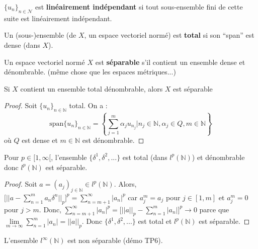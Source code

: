 \begin{definition}
    $\{u_n\}_{n\in\mathcal{N}}$ est \textbf{linéairement indépendant} si tout sous-ensemble fini de cette suite est linéairement indépendant.
\end{definition}

\begin{definition}
    Un (sous-)ensemble (de $X$, un espace vectoriel normé) est \textbf{total} si son ``span'' est dense (dans $X$).
\end{definition}

\begin{definition}
    Un espace vectoriel normé $X$ est \textbf{séparable} s'il contient un ensemble dense et dénombrable. (même chose que les espaces métriques...)
\end{definition}

\begin{theo}
    Si $X$ contient un ensemble total dénombrable, alors $X$ est séparable
\end{theo}

\begin{proof}
    Soit $\{u_n\}_{n\in\mathbb{N}}$ total. On a :
    \begin{equation*}
        \mathrm{span}\{u_n\}_{n\in\mathbb{N}} = \left\{ \sum_{j=1}^m \alpha_j u_{n_j} \Big | n_j\in\mathbb{N}, \alpha_j\in Q,m\in\mathbb{N} \right\}
    \end{equation*}
    où $Q$ est dense et $m\in \mathbb{N}$ est dénombrable.
\end{proof}

\begin{example}
    Pour $p \in [1,\infty[$, l'ensemble $\{\delta^1,\delta^2,...\}$ est total (dans $l^p(\mathbb{N})$) et dénombrable donc $l^p(\mathbb{N})$ est séparable.
\end{example}

\begin{proof}
    Soit $a = (a_j)_{j\in\mathbb{N}} \in l^p(\mathbb{N})$. Alors, $\big[||a-\sum \limits_{n=1}^m a_n \delta^n||_p\big]^p = \sum \limits_{n=m+1}^\infty |a_n|^p$ car $a_j^m = a_j$ pour $j \in [1,m]$ et $a_j^m = 0$ pour $j>m$. Donc, $\sum \limits_{n=m+1}^\infty |a_n|^p = \big[||a||_p - \sum \limits_{n=1}^m |a_n|\big]^p \rightarrow 0$ parce que $\lim \limits_{m\to\infty} \sum \limits_{n=1}^m |a_n| = ||a||_p$. Donc $\{\delta^1,\delta^2,...\}$ est total et $l^p(\mathbb{N})$ est séparable.
\end{proof}

\begin{remark}
    L'ensemble $l^\infty(\mathbb{N})$ est non séparable (démo TP6).
\end{remark}

